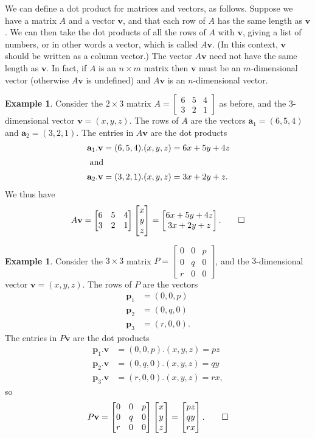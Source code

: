\documentclass[a4paper]{book}
\newcommand{\bbm}       {\begin{bmatrix}}
\newcommand{\ebm}       {\end{bmatrix}}
\newcommand{\tm}        {\times}
\newcommand{\VEC}[1]    {\mathbf{#1}}
\renewcommand{\:}{\colon}
\theoremstyle{definition}
\newtheorem{example}[theorem]{Example}
\begin{document}
We can define a dot product for matrices and vectors, as follows.
Suppose we have a matrix $A$ and a vector $\VEC{v}$, and that each row
of $A$ has the same length as $\VEC{v}$.  We can then take the dot
products of all the rows of $A$ with $\VEC{v}$, giving a list of
numbers, or in other words a vector, which is called $A\VEC{v}$.  (In
this context, $\VEC{v}$ should be written as a column vector.)  The
vector $A\VEC{v}$ need not have the same length as $\VEC{v}$.  In
fact, if $A$ is an $n\tm m$ matrix then $\VEC{v}$ must be an
$m$-dimensional vector (otherwise $A\VEC{v}$ is undefined) and
$A\VEC{v}$ is an $n$-dimensional vector.
\begin{example}
 Consider the $2\tm 3$ matrix
 $A=\bbm 6 & 5 & 4 \\ 3 & 2 & 1 \ebm$
 as before, and the $3$-dimensional vector $\VEC{v}=(x,y,z)$.  The
 rows of $A$ are the vectors $\VEC{a}_1=(6,5,4)$ and
 $\VEC{a}_2=(3,2,1)$.  The entries in $A\VEC{v}$ are the dot products
 \begin{align*}
  \VEC{a}_1.\VEC{v} &= (6,5,4).(x,y,z) = 6x+5y+4z \\
  \intertext{ and }
  \VEC{a}_2.\VEC{v} &= (3,2,1).(x,y,z) = 3x+2y+z.
 \end{align*}
 We thus have
 \[ A\VEC{v} = 
     \bbm 6 & 5 & 4 \\ 3 & 2 & 1 \ebm 
     \bbm x \\ y \\ z \ebm = 
     \bbm 6x+5y+4z \\ 3x+2y+z  \ebm. \qed
 \]
\end{example}
\begin{example}
 Consider the $3\tm 3$ matrix
 $P=\bbm 0&0&p \\ 0&q&0 \\ r&0&0 \ebm$,
 and the $3$-dimensional vector $\VEC{v}=(x,y,z)$.  The
 rows of $P$ are the vectors 
 \begin{align*}
  \VEC{p}_1 &= (0,0,p) \\
  \VEC{p}_2 &= (0,q,0) \\
  \VEC{p}_3 &= (r,0,0).
 \end{align*}
 The entries in $P\VEC{v}$ are the dot products
 \begin{align*}
  \VEC{p}_1.\VEC{v} &= (0,0,p).(x,y,z) = pz \\
  \VEC{p}_2.\VEC{v} &= (0,q,0).(x,y,z) = qy \\
  \VEC{p}_3.\VEC{v} &= (r,0,0).(x,y,z) = rx,
 \end{align*}
 so
 \[ P\VEC{v} = 
     \bbm 0&0&p \\ 0&q&0 \\ r&0&0 \ebm
     \bbm x \\ y \\ z \ebm = 
     \bbm pz \\ qy \\ rx  \ebm. \qed
 \]
\end{example}
\end{document}
